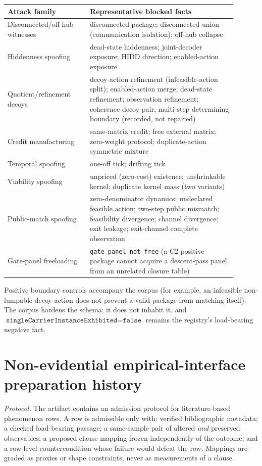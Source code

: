 \documentclass[11pt]{article}
\theoremstyle{definition}
\begin{document}
\begin{center}\footnotesize
\begin{tabular}{p{0.32\linewidth}p{0.58\linewidth}}
\toprule
Attack family & Representative blocked facts \\
\midrule
Disconnected/off-hub witnesses & disconnected package; disconnected union
(communication isolation); off-hub collapse \\
Hiddenness spoofing & dead-state hiddenness; joint-decoder exposure; HIDD
direction; enabled-action exposure \\
Quotient/refinement decoys & decoy-action refinement (infeasible-action
split); enabled-action merge; dead-state refinement; observation refinement;
coherence decoy pair; multi-step determining boundary (recorded, not
repaired) \\
Credit manufacturing & same-matrix credit; free external matrix; zero-weight
protocol; duplicate-action symmetric mixture \\
Temporal spoofing & one-off tick; drifting tick \\
Viability spoofing & unpriced (zero-cost) existence; unshrinkable kernel;
duplicate kernel mass (two variants) \\
Public-match spoofing & zero-denominator dynamics; undeclared feasible
action; two-step public mismatch; feasibility divergence; channel
divergence; exit leakage; exit-channel complete observation \\
Gate-panel freeloading & \texttt{gate\_panel\_not\_free} (a C2-positive
package cannot acquire a descent-pass panel from an unrelated closure table) \\
\bottomrule
\end{tabular}
\end{center}

Positive boundary controls accompany the corpus (for example, an infeasible
non-lumpable decoy action does not prevent a valid package from matching
itself). The corpus hardens the schema; it does not inhabit it, and
$\texttt{singleCarrierInstanceExhibited} = \texttt{false}$ remains the
registry's load-bearing negative fact.

 \section{Non-evidential empirical-interface preparation history}
\label{app:empirical}


\emph{Protocol.} The artifact contains an admission protocol for
literature-based phenomenon rows. A row is admissible only with: verified
bibliographic metadata; a checked load-bearing passage; a same-sample pair of
altered \emph{and} preserved observables; a proposed clause mapping frozen
independently of the outcome; and a row-level countercondition whose failure
would defeat the row. Mappings are graded as proxies or shape constraints,
never as measurements of a clause.
\end{document}
